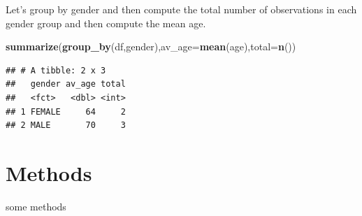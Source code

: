 \documentclass[]{book}
\newenvironment{Shaded}{\begin{snugshade}}{\end{snugshade}}
\newcommand{\DataTypeTok}[1]{\textcolor[rgb]{0.13,0.29,0.53}{#1}}
\newcommand{\KeywordTok}[1]{\textcolor[rgb]{0.13,0.29,0.53}{\textbf{#1}}}
\newcommand{\NormalTok}[1]{#1}
\begin{document}
Let's group by gender and then compute the total number of observations in each gender group and then compute the mean age.

\begin{Shaded}
\begin{Highlighting}[]
\KeywordTok{summarize}\NormalTok{(}\KeywordTok{group_by}\NormalTok{(df,gender),}\DataTypeTok{av_age=}\KeywordTok{mean}\NormalTok{(age),}\DataTypeTok{total=}\KeywordTok{n}\NormalTok{())}
\end{Highlighting}
\end{Shaded}

\begin{verbatim}
## # A tibble: 2 x 3
##   gender av_age total
##   <fct>   <dbl> <int>
## 1 FEMALE     64     2
## 2 MALE       70     3
\end{verbatim}

\hypertarget{methods}{%
\chapter{Methods}\label{methods}}

some methods


\end{document}
